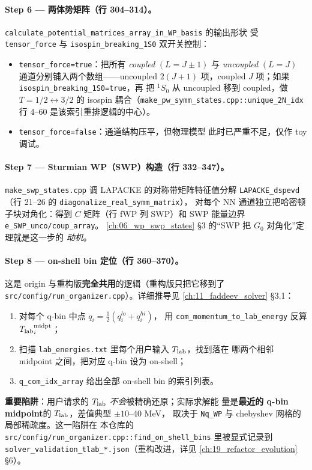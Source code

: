 \paragraph{Step 6 — 两体势矩阵（行 304--314）。}
\texttt{calculate\_potential\_matrices\_array\_in\_WP\_basis} 的输出形状
受 \texttt{tensor\_force} 与 \texttt{isospin\_breaking\_1S0} 双开关控制：
\begin{itemize}
\item \texttt{tensor\_force=true}：把所有 \emph{coupled} $(L=J\!\pm\!1)$
      与 \emph{uncoupled} $(L=J)$ 通道分别铺入两个数组——uncoupled $2(J+1)$
      项，coupled $J$ 项；如果 \texttt{isospin\_breaking\_1S0=true}，再
      把 $^1S_0$ 从 uncoupled 移到 coupled，做 $T = 1/2 \leftrightarrow 3/2$
      的 isospin 耦合（\texttt{make\_pw\_symm\_states.cpp::unique\_2N\_idx}
      行 4--60 是该索引重排逻辑的中心）。
\item \texttt{tensor\_force=false}：通道结构压平，但物理模型
      此时已严重不足，仅作 toy 调试。
\end{itemize}

\paragraph{Step 7 — Sturmian WP（SWP）构造（行 332--347）。}
\texttt{make\_swp\_states.cpp} 调 LAPACKE 的对称带矩阵特征值分解
\texttt{LAPACKE\_dspevd}（行 21--26 的 \texttt{diagonalize\_real\_symm\_matrix}），
对每个 NN 通道独立把哈密顿子块对角化：得到 $C$ 矩阵（行 fWP 列 SWP）和
SWP 能量边界 \texttt{e\_SWP\_unco/coup\_array}。
\cref{ch:06_wp_swp_states} §3 的“SWP 把 $G_0$ 对角化”定理就是这一步的
\emph{动机}。

\paragraph{Step 8 — on-shell bin 定位（行 360--370）。}
这是 origin 与重构版\textbf{完全共用}的逻辑（重构版只把它移到了
\texttt{src/config/run\_organizer.cpp}）。详细推导见
\cref{ch:11_faddeev_solver} §3.1：
\begin{enumerate}
\item 对每个 q-bin 中点 $q_i = \tfrac{1}{2}(q_i^{lo} + q_i^{hi})$，
      用 \texttt{com\_momentum\_to\_lab\_energy} 反算
      ${T_{\text{lab}}}^{\rm midpt}_i$；
\item 扫描 \texttt{lab\_energies.txt} 里每个用户输入 ${T_{\text{lab}}}$，找到落在
      哪两个相邻 midpoint 之间，把对应 q-bin 设为 on-shell；
\item \texttt{q\_com\_idx\_array} 给出全部 on-shell bin 的索引列表。
\end{enumerate}
\textbf{重要陷阱}：用户请求的 ${T_{\text{lab}}}$ \emph{不会}被精确还原；实际求解能
量是\textbf{最近的 q-bin midpoint}的 ${T_{\text{lab}}}$，差值典型 $\pm 10$--40 MeV，
取决于 \texttt{Nq\_WP} 与 chebyshev 网格的局部稀疏度。这一陷阱在
本仓库的 \texttt{src/config/run\_organizer.cpp::find\_on\_shell\_bins}
里被显式记录到 \texttt{solver\_validation\_tlab\_*.json}（重构改进，详见
\cref{ch:19_refactor_evolution} §6）。

